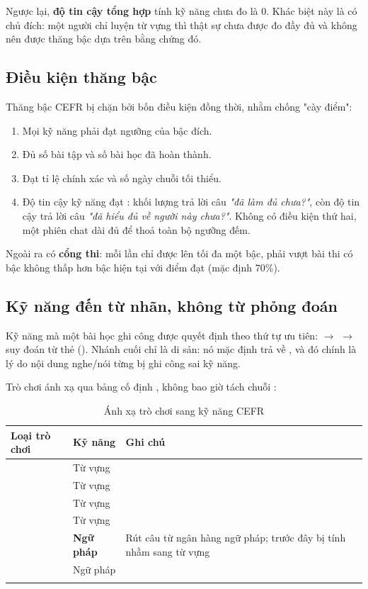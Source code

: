 Ngược lại, \textbf{độ tin cậy tổng hợp} tính kỹ năng chưa đo là 0. Khác biệt này là có
chủ đích: một người chỉ luyện từ vựng thì thật sự chưa được đo đầy đủ và không nên được
thăng bậc dựa trên bằng chứng đó.

\subsection{Điều kiện thăng bậc}

Thăng bậc CEFR bị chặn bởi bốn điều kiện đồng thời, nhằm chống "cày điểm":

\begin{enumerate}[leftmargin=1.4em]
  \item Mọi kỹ năng phải đạt ngưỡng của bậc đích.
  \item Đủ số bài tập và số bài học đã hoàn thành.
  \item Đạt tỉ lệ chính xác và số ngày chuỗi tối thiểu.
  \item Độ tin cậy kỹ năng đạt : khối lượng trả lời câu
  \textit{"đã làm đủ chưa?"}, còn độ tin cậy trả lời câu \textit{"đã hiểu đủ về người này
  chưa?"}. Không có điều kiện thứ hai, một phiên chat dài đủ để thoả toàn bộ ngưỡng đếm.
\end{enumerate}

Ngoài ra có \textbf{cổng thi}: mỗi lần chỉ được lên tối đa một bậc, phải vượt bài thi có
bậc không thấp hơn bậc hiện tại với điểm đạt (mặc định 70\%).

\subsection{Kỹ năng đến từ nhãn, không từ phỏng đoán}

Kỹ năng mà một bài học ghi công được quyết định theo thứ tự ưu tiên:
 $\rightarrow$  $\rightarrow$ suy đoán từ thẻ
(). Nhánh cuối chỉ là di sản: nó mặc định trả về
, và đó chính là lý do nội dung nghe/nói từng bị ghi công sai kỹ năng.

Trò chơi ánh xạ qua bảng cố định , không bao giờ tách chuỗi
:

\begin{longtable}{L{4.2cm} L{3.4cm} L{6.0cm}}
\toprule
\textbf{Loại trò chơi} & \textbf{Kỹ năng} & \textbf{Ghi chú}\\
\midrule
\endhead
{} & Từ vựng & \\
 & Từ vựng & \\
 & Từ vựng & \\
 & Từ vựng & \\
 & \textbf{Ngữ pháp} & Rút câu từ ngân hàng ngữ pháp; trước đây bị tính nhầm sang từ vựng\\
 & Ngữ pháp & \\
\bottomrule
\caption{Ánh xạ trò chơi sang kỹ năng CEFR}
\end{longtable}

